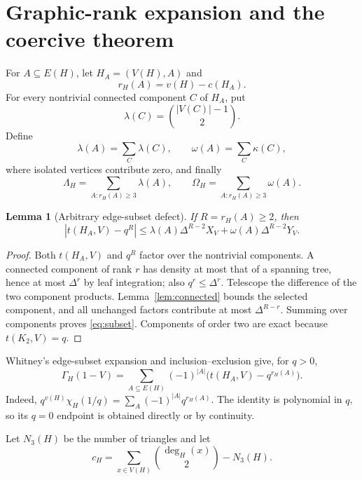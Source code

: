 \documentclass[11pt]{article}
\newtheorem{lemma}[theorem]{Lemma}
\begin{document}
\section{Graphic-rank expansion and the coercive theorem}

For $A\subseteq E(H)$, let $H_A=(V(H),A)$ and
\[
 r_H(A)=v(H)-c(H_A).
\]
For every nontrivial connected component $C$ of $H_A$, put
\[
 \lambda(C)=\binom{|V(C)|-1}{2}.
\]
Define
\[
 \lambda(A)=\sum_C\lambda(C),
 \qquad
 \omega(A)=\sum_C\kappa(C),
\]
where isolated vertices contribute zero, and finally
\begin{equation}
 \Lambda_H=\sum_{A:r_H(A)\geq3}\lambda(A),
 \qquad
 \Omega_H=\sum_{A:r_H(A)\geq3}\omega(A).
 \label{eq:global-constants}
\end{equation}

\begin{lemma}[Arbitrary edge-subset defect]
\label{lem:subset}
If $R=r_H(A)\geq2$, then
\begin{equation}
 \left|t(H_A,V)-q^R\right|
 \leq\lambda(A)\Delta^{R-2}X_V
     +\omega(A)\Delta^{R-2}Y_V.
 \label{eq:subset}
\end{equation}
\end{lemma}

\begin{proof}
Both $t(H_A,V)$ and $q^R$ factor over the nontrivial components.  A connected
component of rank $r$ has density at most that of a spanning tree, hence at
most $\Delta^r$ by leaf integration; also $q^r\leq\Delta^r$.  Telescope the
difference of the two component products.  Lemma~\ref{lem:connected} bounds
the selected component, and all unchanged factors contribute at most
$\Delta^{R-r}$.  Summing over components proves \eqref{eq:subset}.  Components
of order two are exact because $t(K_2,V)=q$.
\end{proof}

Whitney's edge-subset expansion and inclusion--exclusion give, for $q>0$,
\begin{equation}
 \Gamma_H(1-V)=\sum_{A\subseteq E(H)}(-1)^{|A|}
 \bigl(t(H_A,V)-q^{r_H(A)}\bigr).
 \label{eq:rank-expansion}
\end{equation}
Indeed,
$q^{v(H)}\chi_H(1/q)=\sum_A(-1)^{|A|}q^{r_H(A)}$.
The identity is polynomial in $q$, so its $q=0$ endpoint is obtained directly
or by continuity.

Let $N_3(H)$ be the number of triangles and let
\[
 c_H=\sum_{x\in V(H)}\binom{\deg_H(x)}2-N_3(H).
\]
\end{document}
